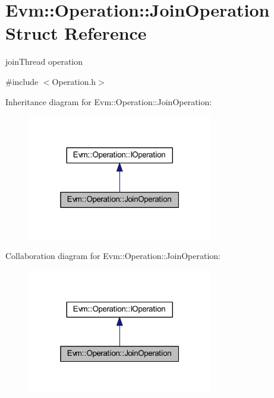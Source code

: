 \hypertarget{struct_evm_1_1_operation_1_1_join_operation}{}\section{Evm\+:\+:Operation\+:\+:Join\+Operation Struct Reference}
\label{struct_evm_1_1_operation_1_1_join_operation}


join\+Thread operation  




{\ttfamily \#include $<$Operation.\+h$>$}



Inheritance diagram for Evm\+:\+:Operation\+:\+:Join\+Operation\+:
\nopagebreak
\begin{figure}[H]
\begin{center}
\leavevmode
\includegraphics[width=229pt]{struct_evm_1_1_operation_1_1_join_operation__inherit__graph}
\end{center}
\end{figure}


Collaboration diagram for Evm\+:\+:Operation\+:\+:Join\+Operation\+:
\nopagebreak
\begin{figure}[H]
\begin{center}
\leavevmode
\includegraphics[width=229pt]{struct_evm_1_1_operation_1_1_join_operation__coll__graph}
\end{center}
\end{figure}
